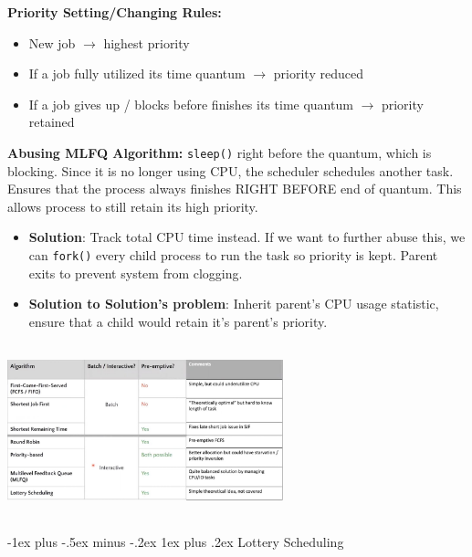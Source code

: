 \documentclass[10pt,landscape]{article}
\makeatletter
\renewcommand{\subsubsection}{\@startsection{subsubsection}{3}{0mm}%
                                {-1ex plus -.5ex minus -.2ex}%
                                {1ex plus .2ex}%
                                {\normalfont\small\bfseries}}
\makeatother
\begin{document}
\begin{multicols*}{3}
\textbf{Priority Setting/Changing Rules:}
\begin{itemize}[topsep=0pt,noitemsep,wide=0pt, leftmargin=\dimexpr{} + 2\relax]
    \item New job $\rightarrow$ highest priority
    \item If a job fully utilized its time quantum $\rightarrow$ priority reduced
    \item If a job gives up / blocks before finishes its time quantum $\rightarrow$ priority retained
\end{itemize}

\textbf{Abusing MLFQ Algorithm:}
\verb|sleep()| right before the quantum, which is blocking. Since it is no longer using CPU,
the scheduler schedules another task. Ensures that the process always finishes RIGHT BEFORE end of quantum.
This allows process to still retain its high priority.
\begin{itemize}[topsep=0pt,noitemsep,wide=0pt, leftmargin=\dimexpr{} + 2\relax]
    \item \textbf{Solution}: Track total CPU time instead. If we want to further abuse this, we can \verb|fork()| every child process
    to run the task so priority is kept. Parent exits to prevent system from clogging. 
    \item \textbf{Solution to Solution's problem}: Inherit parent's CPU usage statistic, ensure that a child would retain it's parent's priority.
\end{itemize}

\includegraphics*[width=8cm, height=5cm]{images/schedulingtable.jpg}


\subsubsection{Lottery Scheduling}    


\end{multicols*}
\end{document}
